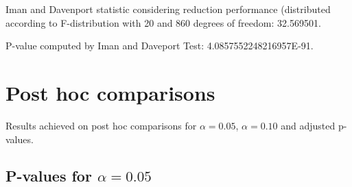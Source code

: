 \documentclass[a4paper,10pt]{article}
\begin{document}
\begin{landscape}
Iman and Davenport statistic considering reduction performance (distributed according to F-distribution with 20 and 860 degrees of freedom: 32.569501.

P-value computed by Iman and Daveport Test: 4.0857552248216957E-91.\newline



\pagebreak

\section{Post hoc comparisons}

Results achieved on post hoc comparisons for $\alpha = 0.05$, $\alpha = 0.10$ and adjusted p-values.

\subsection{P-values for $\alpha=0.05$}


\end{landscape}
\end{document}
